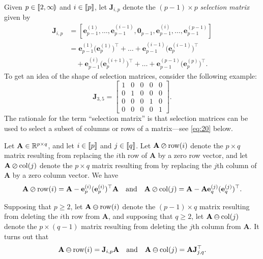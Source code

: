 \documentclass[11pt,a4paper]{article}
\DeclarePairedDelimiter\Brackets{\llbracket}{\rrbracket}
\DeclarePairedDelimiter\SemiOpenBrackets{\llbracket}{\rrparenthesis}
\theoremstyle{break}
\numberwithin{dummy}{section}
\theoremstyle{plain}
\theoremstyle{plain}
\theoremstyle{plain}
\theoremstyle{plain}
\theoremstyle{plain}
\theoremstyle{MyNonumberplain}
\newcommand{\0}{\M{0}}
\newcommand{\M}[1]{\mathbf{#1}}
\newcommand{\R}{\mathbb{R}}
\newcommand{\T}{\top}
\newcommand{\eve}[2]{\mathbf{e}^{(#1)}_{#2}}
\newcommand{\Mat}[2]{%
  \ifthenelse{\equal{#2}{1}}
  {\R^{#1}}
  {\R^{#1 \times #2}}
}
\newcommand{\delcol}[2]{\M{#1} \varominus {\mathrm{col}}({#2})}
\newcommand{\delrow}[2]{\M{#1} \varominus \mathrm{row}(#2)}
\newcommand{\sel}[2]{\M{J}_{#1,#2}}
\newcommand{\zercol}[2]{\M{#1} \varoslash \mathrm{col}(#2)}
\newcommand{\zerrow}[2]{\M{#1} \varoslash \mathrm{row}(#2)}
\begin{document}
Given $p \in \SemiOpenBrackets{2,\infty}$ and $i \in \Brackets{p}$, let $\sel{i}{p}$ denote the $(p-1) \times p$ \emph{selection matrix} given by
\begin{align*}
  \sel{i}{p}
  & =
    [\eve{1}{p-1}, \dots, \eve{i-1}{p-1},
    \0_{p-1}, \eve{i}{p-1}, \dots, \eve{p-1}{p-1}]
  \\
  & =
    \eve{1}{p-1}\big(\eve{1}{p}\big)^\T
    +
    \dots
    +
    \eve{i-1}{p-1}\big(\eve{i-1}{p}\big)^\T
  \\
  & \quad
    +
    \eve{i}{p-1}\big(\eve{i+1}{p}\big)^\T
    +
    \dots
    +
    \eve{p-1}{p-1}\big(\eve{p}{p}\big)^\T.
\end{align*}
To get an idea of the shape of selection matrices, consider the following example:
\begin{displaymath}
  \sel{3}{5}
  =
  \begin{bmatrix}
    1 & 0 & 0 & 0 & 0
    \\
    0 & 1 & 0 & 0 & 0
    \\
    0 & 0 & 0 & 1 & 0
    \\
    0 & 0 & 0 & 0 & 1
  \end{bmatrix}.
\end{displaymath}
The rationale for the term ``selection matrix'' is that selection matrices can be used to select a subset of columns or rows of a matrix---see \eqref{eq:20} below.

Let $\M{A} \in \Mat{p}{q}$, and let $i \in \Brackets{p}$ and $j \in \Brackets{q}$. Let $\zerrow{A}{i}$ denote the $p \times q$ matrix resulting from replacing the $i$th row of $\M{A}$ by a zero row vector, and let $\zercol{A}{j}$ denote the $p \times q$ matrix resulting from by replacing the $j$th column of $\M{A}$ by a zero column vector.  We have
\begin{equation}
  \label{eq:19}
  \zerrow{A}{i} = \M{A} - \eve{i}{p} (\eve{i}{p})^\T \M{A} 
  \quad
  \text{and}
  \quad
  \zercol{A}{j} = \M{A} - \M{A} \eve{j}{q} (\eve{j}{q})^\T.
\end{equation}

Supposing that $p \geq 2$, let $\delrow{A}{i}$ denote the $(p - 1) \times q$ matrix resulting from deleting the $i$th row from $\M{A}$, and supposing that $q \geq 2$, let $\delcol{A}{j}$ denote the $p \times (q - 1)$ matrix resulting from deleting the $j$th column from $\M{A}$.  It turns out that
\begin{equation}
  \label{eq:20}
  \delrow{A}{i} = \sel{i}{p} \M{A}
  \quad
  \text{and}
  \quad
  \delcol{A}{j} = \M{A} \sel{j}{q}^\T.
\end{equation}
\end{document}
